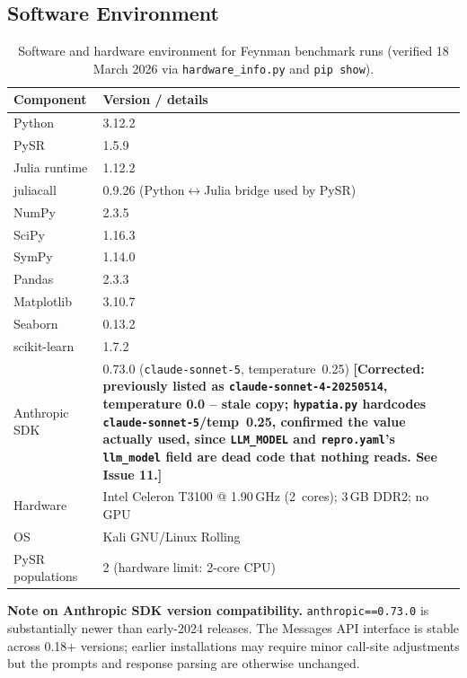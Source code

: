\documentclass[twoside,11pt]{article}
\begin{document}
\subsection*{Software Environment}

\begin{table}[H]
\centering
\caption{Software and hardware environment for Feynman benchmark runs
         (verified 18 March 2026 via \texttt{hardware\_info.py} and
         \texttt{pip show}).}
\label{tab:software_env}
\small
\begin{tabular}{ll}
\toprule
\textbf{Component} & \textbf{Version / details} \\
\midrule
Python           & 3.12.2 \\
PySR             & 1.5.9 \\
Julia runtime    & 1.12.2 \\
juliacall        & 0.9.26 (Python$\leftrightarrow$Julia bridge used by PySR) \\
NumPy            & 2.3.5 \\
SciPy            & 1.16.3 \\
SymPy            & 1.14.0 \\
Pandas           & 2.3.3 \\
Matplotlib       & 3.10.7 \\
Seaborn          & 0.13.2 \\
scikit-learn     & 1.7.2 \\
Anthropic SDK    & 0.73.0 (\texttt{claude-sonnet-5},
                   temperature~0.25) \textbf{[Corrected: previously listed
                   as \texttt{claude-sonnet-4-20250514}, temperature 0.0
                   -- stale copy; \texttt{hypatia.py} hardcodes
                   \texttt{claude-sonnet-5}/temp~0.25, confirmed the
                   value actually used, since \texttt{LLM\_MODEL} and
                   \texttt{repro.yaml}'s \texttt{llm\_model} field are
                   dead code that nothing reads. See Issue 11.]} \\
\midrule
Hardware         & Intel Celeron T3100 @ 1.90\,GHz (2~cores);
                   3\,GB DDR2; no GPU \\
OS               & Kali GNU/Linux Rolling \\
PySR populations & 2 (hardware limit: 2-core CPU) \\
\bottomrule
\end{tabular}
\end{table}

\noindent\textbf{Note on Anthropic SDK version compatibility.}
\texttt{anthropic==0.73.0} is substantially newer than early-2024 releases.
The Messages API interface is stable across 0.18$+$ versions; earlier
installations may require minor call-site adjustments but the prompts and
response parsing are otherwise unchanged.
\end{document}
